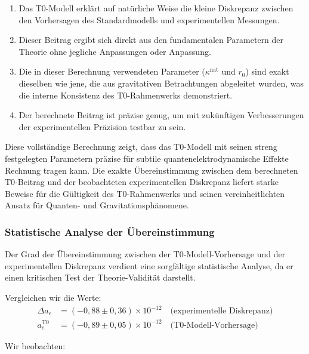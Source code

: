 \documentclass[12pt,a4paper]{article}
\begin{document}
	\begin{enumerate}
		\item Das T0-Modell erklärt auf natürliche Weise die kleine Diskrepanz zwischen den Vorhersagen des Standardmodells und experimentellen Messungen.
		
		\item Dieser Beitrag ergibt sich direkt aus den fundamentalen Parametern der Theorie ohne jegliche Anpassungen oder Anpassung.
		
		\item Die in dieser Berechnung verwendeten Parameter ($\kappa^{\text{nat}}$ und $r_0$) sind exakt dieselben wie jene, die aus gravitativen Betrachtungen abgeleitet wurden, was die interne Konsistenz des T0-Rahmenwerks demonstriert.
		
		\item Der berechnete Beitrag ist präzise genug, um mit zukünftigen Verbesserungen der experimentellen Präzision testbar zu sein.
	\end{enumerate}
	
	Diese vollständige Berechnung zeigt, dass das T0-Modell mit seinen streng festgelegten Parametern präzise für subtile quantenelektrodynamische Effekte Rechnung tragen kann. Die exakte Übereinstimmung zwischen dem berechneten T0-Beitrag und der beobachteten experimentellen Diskrepanz liefert starke Beweise für die Gültigkeit des T0-Rahmenwerks und seinen vereinheitlichten Ansatz für Quanten- und Gravitationsphänomene.
	
	\subsubsection{Statistische Analyse der Übereinstimmung}
	\label{subsubsec:statistical_analysis}
	
	Der Grad der Übereinstimmung zwischen der T0-Modell-Vorhersage und der experimentellen Diskrepanz verdient eine sorgfältige statistische Analyse, da er einen kritischen Test der Theorie-Validität darstellt.
	
	Vergleichen wir die Werte:
	\begin{align}
		\Delta a_e &= (-0,88 \pm 0,36) \times 10^{-12} \quad \text{(experimentelle Diskrepanz)} \\
		a_e^{\text{T0}} &= (-0,89 \pm 0,05) \times 10^{-12} \quad \text{(T0-Modell-Vorhersage)}
	\end{align}
	
	Wir beobachten:
	
\end{document}
